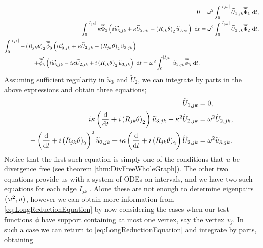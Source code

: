 \begin{subequations} \label{eq:SplitVariationalEdgeEqns}
	\begin{align}
		0 &= \omega^2 \int_0^{\left\lvert I_{jk} \right\rvert} \widetilde{U}_{1,jk}\overline{\widetilde{\Phi}}_1 \ \mathrm{d} t, \\
		\int_0^{\left\lvert I_{jk} \right\rvert} \kappa\overline{\widetilde{\Phi}}_2\left( i\widetilde{u}_{3,jk}' + \kappa\widetilde{U}_{2,jk} - \left( R_{jk}\theta \right)_2\widetilde{u}_{3,jk} \right) \ \mathrm{d} t
		&= \omega^2 \int_0^{\left\lvert I_{jk} \right\rvert} \widetilde{U}_{2,jk}\overline{\widetilde{\Phi}}_2 \ \mathrm{d} t, \\
		\begin{split}
			\int_0^{\left\lvert I_{jk} \right\rvert} -\left( R_{jk}\theta \right)_2\overline{\widetilde{\phi}}_3\left( i\widetilde{u}_{3,jk}' + \kappa\widetilde{U}_{2,jk} - \left( R_{jk}\theta \right)_2\widetilde{u}_{3,jk} \right) \quad & \\
			+ \overline{\widetilde{\phi}}_3'\left( i\widetilde{u}_{3,jk}' - i\kappa\widetilde{U}_{2,jk} + i\left( R_{jk}\theta \right)_2\widetilde{u}_{3,jk} \right) \ \mathrm{d} t
			&= \omega^2 \int_0^{\left\lvert I_{jk} \right\rvert} \widetilde{u}_{3,jk}\overline{\widetilde{\phi}}_3 \ \mathrm{d} t.
		\end{split}
	\end{align}
\end{subequations}
Assuming sufficient regularity in $\widetilde{u}_3$ and $\widetilde{U}_2$, we can integrate by parts in the above expressions and obtain three equations;
\begin{align*}
	\widetilde{U}_{1,jk} &= 0, \\
	i\kappa\left( \dfrac{\mathrm{d}}{\mathrm{d}t} + i\left( R_{jk}\theta \right)_2 \right)\widetilde{u}_{3,jk} + \kappa^2\widetilde{U}_{2,jk} &= \omega^2 \widetilde{U}_{2,jk}, \\
	-\left( \dfrac{\mathrm{d}}{\mathrm{d}t} + i\left( R_{jk}\theta \right)_2 \right)^2\widetilde{u}_{3,jk} + i\kappa\left( \dfrac{\mathrm{d}}{\mathrm{d}t} + i\left( R_{jk}\theta \right)_2 \right)\widetilde{U}_{2,jk} &= \omega^2\widetilde{u}_{3,jk}.
\end{align*}
Notice that the first such equation is simply one of the conditions that $u$ be divergence free (see theorem \ref{thm:DivFreeWholeGraph}).
The other two equations provide us with a system of ODEs on intervals, and we have two such equations for each edge $I_{jk}$ .
Alone these are not enough to determine eigenpairs $\left( \omega^2, u \right)$, however we can obtain more information from \eqref{eq:LongReductionEquation} by now considering the cases when our test functions $\phi$ have support containing at most one vertex, say the vertex $v_j$.
In such a case we can return to \eqref{eq:LongReductionEquation} and integrate by parts, obtaining 
